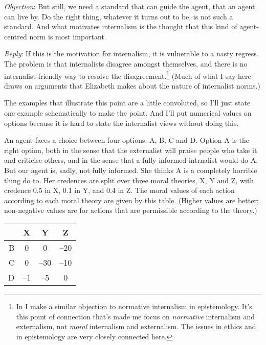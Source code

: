 \emph{Objection}: But still, we need a standard that can guide the agent, that an agent can live by. Do the right thing, whatever it turns out to be, is not such a standard. And what motivates internalism is the thought that this kind of agent-centred norm is most important.

\emph{Reply}: If this is the motivation for internalism, it is vulnerable to a nasty regress. The problem is that internalists disagree amongst themselves, and there is no internal\-ist-friendly way to resolve the disagreement.\footnote{In  \citet{Weatherson2013diss} I make a similar objection to normative internalism in epistemology. It's this point of connection that's made me focus on \emph{normative} internalism and externalism, not \emph{moral} internalism and externalism. The issues in ethics and in epistemology are very closely connected here.} (Much of what I say here draws on arguments that Elizabeth  \citet{Harman2013} makes about the nature of internalist norms.)

The examples that illustrate this point are a little convoluted, so I'll just state one example schematically to make the point. And I'll put numerical values on options because it is hard to state the internalist views without doing this.

An agent faces a choice between four options: A, B, C and D. Option A is the right option, both in the sense that the externalist will praise people who take it and criticise others, and in the sense that a fully informed intrnalist would do A. But our agent is, sadly, not fully informed. She thinks A is a completely horrible thing do to. Her credences are split over three moral theories, X, Y and Z, with credence 0.5 in X, 0.1 in Y, and 0.4 in Z. The moral values of each action according to each moral theory are given by this table. (Higher values are better; non-negative values are for actions that are permissible according to the theory.)

\begin{table}[htbp]
\begin{minipage}{\linewidth}
\setlength{\tymax}{0.5\linewidth}
\centering
\small
\begin{tabulary}{\textwidth}{@{}RCCC@{}} \toprule
&X&Y&Z\\
\midrule
B&0&0&--20\\
C&0&--30&--10\\
D&--1&--5&0\\

\bottomrule

\end{tabulary}
\end{minipage}
\end{table}


